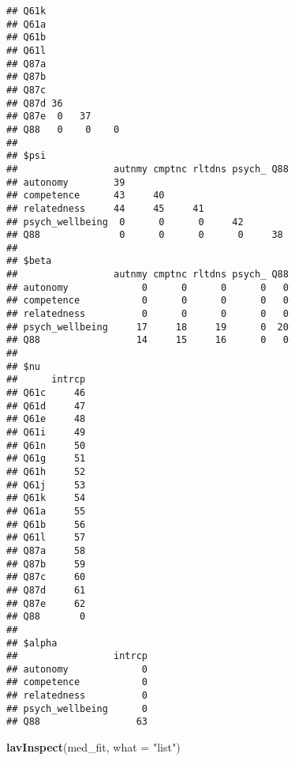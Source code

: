 \documentclass[
]{article}
\newenvironment{Shaded}{\begin{snugshade}}{\end{snugshade}}
\newcommand{\DataTypeTok}[1]{\textcolor[rgb]{0.13,0.29,0.53}{#1}}
\newcommand{\KeywordTok}[1]{\textcolor[rgb]{0.13,0.29,0.53}{\textbf{#1}}}
\newcommand{\NormalTok}[1]{#1}
\newcommand{\StringTok}[1]{\textcolor[rgb]{0.31,0.60,0.02}{#1}}
\begin{document}
\begin{verbatim}
## Q61k              
## Q61a              
## Q61b              
## Q61l              
## Q87a              
## Q87b              
## Q87c              
## Q87d 36           
## Q87e  0   37      
## Q88   0    0    0 
## 
## $psi
##                 autnmy cmptnc rltdns psych_ Q88
## autonomy        39                             
## competence      43     40                      
## relatedness     44     45     41               
## psych_wellbeing  0      0      0     42        
## Q88              0      0      0      0     38 
## 
## $beta
##                 autnmy cmptnc rltdns psych_ Q88
## autonomy             0      0      0      0   0
## competence           0      0      0      0   0
## relatedness          0      0      0      0   0
## psych_wellbeing     17     18     19      0  20
## Q88                 14     15     16      0   0
## 
## $nu
##      intrcp
## Q61c     46
## Q61d     47
## Q61e     48
## Q61i     49
## Q61n     50
## Q61g     51
## Q61h     52
## Q61j     53
## Q61k     54
## Q61a     55
## Q61b     56
## Q61l     57
## Q87a     58
## Q87b     59
## Q87c     60
## Q87d     61
## Q87e     62
## Q88       0
## 
## $alpha
##                 intrcp
## autonomy             0
## competence           0
## relatedness          0
## psych_wellbeing      0
## Q88                 63
\end{verbatim}

\begin{Shaded}
\begin{Highlighting}[]
\KeywordTok{lavInspect}\NormalTok{(med_fit, }\DataTypeTok{what =} \StringTok{"list"}\NormalTok{)}
\end{Highlighting}
\end{Shaded}
\end{document}
